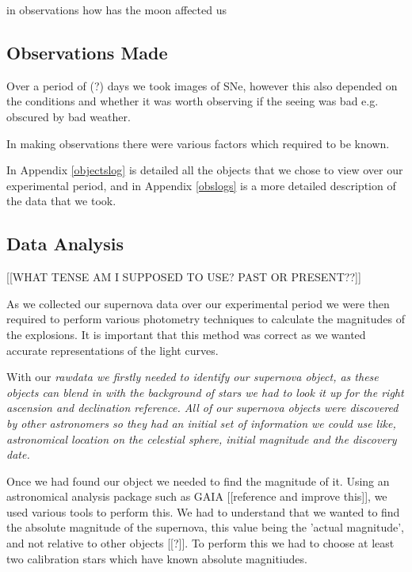 \documentclass[twocolumn]{revtex4}
\begin{document}
in observations how has the moon affected us


\vspace{-3ex}
\subsection{Observations Made}
\vspace{-2ex}

Over a period of (?) days we took images of SNe, however this also depended on the conditions and whether it was worth observing if the seeing was bad e.g. obscured by bad weather.

In making observations there were various factors which required to be known.

In Appendix \ref{objectslog} is detailed all the objects that we chose to view over our experimental period, and in Appendix \ref{obslogs} is a more detailed description of the data that we took.

\vspace{-3ex}
\subsection{Data Analysis}
\vspace{-2ex}

[[WHAT TENSE AM I SUPPOSED TO USE? PAST OR PRESENT??]]

As we collected our supernova data over our experimental period we were then required to perform various photometry techniques to calculate the magnitudes of the explosions. It is important that this method was correct as we wanted accurate representations of the light curves. 

With our \em{raw}\em data we firstly needed to identify our supernova object, as these objects can blend in with the background of stars we had to look it up for the right ascension and declination reference. All of our supernova objects were discovered by other astronomers so they had an initial set of information we could use like, astronomical location on the celestial sphere, initial magnitude and the discovery date.

Once we had found our object we needed to find the magnitude of it. Using an astronomical analysis package such as GAIA [[reference and improve this]], we used various tools to perform this. We had to understand that we wanted to find the absolute magnitude of the supernova, this value being the 'actual magnitude', and not relative to other objects [[?]]. To perform this we had to choose at least two calibration stars which have known absolute magnitiudes.
\end{document}
